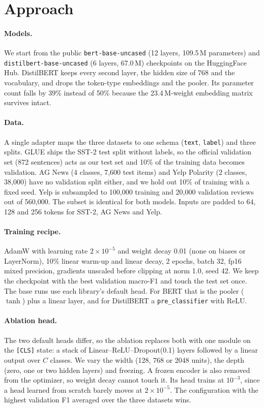 \section{Approach}
\label{sec:approach}

\paragraph{Models.} We start from the public \texttt{bert-base-uncased}
(12 layers, 109.5\,M parameters) and \texttt{distilbert-base-uncased}
(6 layers, 67.0\,M) checkpoints on the HuggingFace Hub. DistilBERT keeps every
second layer, the hidden size of 768 and the vocabulary, and drops the
token-type embeddings and the pooler. Its parameter count falls by 39\%
instead of 50\% because the 23.4\,M-weight embedding matrix survives intact.

\paragraph{Data.} A single adapter maps the three datasets to one schema
(\texttt{text}, \texttt{label}) and three splits. GLUE ships the SST-2 test
split without labels, so the official validation set (872 sentences) acts as
our test set and 10\% of the training data becomes validation. AG News
(4 classes, 7{,}600 test items) and Yelp Polarity (2 classes, 38{,}000) have
no validation split either, and we hold out 10\% of training with a fixed
seed. Yelp is subsampled to 100{,}000 training and 20{,}000 validation reviews
out of 560{,}000. The subset is identical for both models. Inputs are padded
to 64, 128 and 256 tokens for SST-2, AG News and Yelp.

\paragraph{Training recipe.} AdamW with learning rate $2\times10^{-5}$ and
weight decay 0.01 (none on biases or LayerNorm), 10\% linear warm-up and
linear decay, 2 epochs, batch 32, fp16 mixed precision, gradients unscaled
before clipping at norm 1.0, seed 42. We keep the checkpoint with the best
validation macro-F1 and touch the test set once. The base runs use each
library's default head. For BERT that is the pooler ($\tanh$) plus a linear
layer, and for DistilBERT a \texttt{pre\_classifier} with ReLU.

\paragraph{Ablation head.} The two default heads differ, so the ablation
replaces both with one module on the \texttt{[CLS]} state: a stack of
Linear--ReLU--Dropout(0.1) layers followed by a linear output over $C$
classes. We vary the width (128, 768 or 2048 units), the depth (zero, one or
two hidden layers) and freezing. A frozen encoder is also removed from the
optimizer, so weight decay cannot touch it. Its head trains at $10^{-3}$, since a head learned from scratch
barely moves at $2\times10^{-5}$. The configuration with the highest validation F1 averaged over the
three datasets wins.

